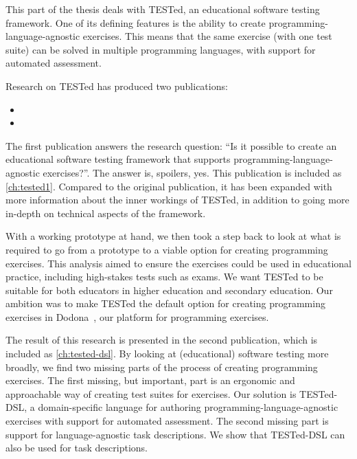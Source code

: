 \documentclass[./main]{subfiles}
\begin{document}
\label{ch:preface-1}

This part of the thesis deals with TESTed, an educational software testing framework.
One of its defining features is the ability to create programming-language-agnostic exercises.
This means that the same exercise (with one test suite) can be solved in multiple programming languages, with support for automated assessment.

Research on TESTed has produced two publications:

\begin{itemize}
    \item {}
    \item {}
\end{itemize}

The first publication answers the research question: ``Is it possible to create an educational software testing framework that supports programming-language-agnostic exercises?''.
The answer is, spoilers, yes.
This publication is included as \cref{ch:tested1}.
Compared to the original publication, it has been expanded with more information about the inner workings of TESTed, in addition to going more in-depth on technical aspects of the framework.

With a working prototype at hand, we then took a step back to look at what is required to go from a prototype to a viable option for creating programming exercises.
This analysis aimed to ensure the exercises could be used in educational practice, including high-stakes tests such as exams.
We want TESTed to be suitable for both educators in higher education and secondary education.
Our ambition was to make TESTed the default option for creating programming exercises in Dodona~\autocite{vanpetegemDodonaLearnCode2023}, our platform for programming exercises.

The result of this research is presented in the second publication, which is included as \cref{ch:tested-dsl}.
By looking at (educational) software testing more broadly, we find two missing parts of the process of creating programming exercises.
The first missing, but important, part is an ergonomic and approachable way of creating test suites for exercises.
Our solution is TESTed-DSL, a domain-specific language for authoring programming-language-agnostic exercises with support for automated assessment.
The second missing part is support for language-agnostic task descriptions.
We show that TESTed-DSL can also be used for task descriptions.
\end{document}
